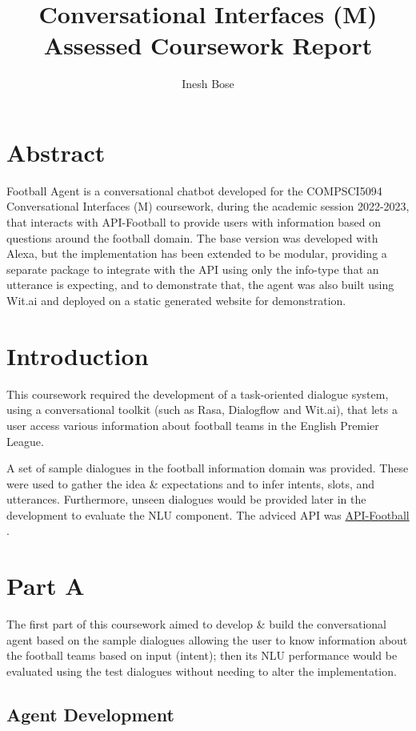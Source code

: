 \documentclass[10pt,a4paper,twocolumn]{article}
\title{Conversational Interfaces (M)\\Assessed Coursework Report}
\author{Inesh Bose}
\date{}
\newcommand{\cmmnt}[1]{}
\begin{document}
\maketitle

\section*{Abstract}

Football Agent is a conversational chatbot developed for the COMPSCI5094 Conversational Interfaces (M) coursework, during the academic session 2022-2023, that interacts with API-Football to provide users with information based on questions around the football domain. The base version was developed with Alexa, but the implementation has been extended to be modular, providing a separate package to integrate with the API using only the info-type that an utterance is expecting, and to demonstrate that, the agent was also built using Wit.ai and deployed on a static generated website for demonstration.

\section{Introduction}

This coursework required the development of a task-oriented dialogue system, using a conversational toolkit (such as Rasa, Dialogflow and Wit.ai), that lets a user access various information about football teams in the English Premier League.

A set of sample dialogues in the football information domain was provided. These were used to gather the idea \& expectations and to infer intents, slots, and utterances. Furthermore, unseen dialogues would be provided later in the development to evaluate the NLU component. The adviced API was \href{https://www.api-football.com/}{API-Football} \cite{APIFootb40:online}.

\section{Part A}

The first part of this coursework aimed to develop \& build the conversational agent based on the sample dialogues allowing the user to know information about the football teams based on input (intent); then its NLU performance would be evaluated using the test dialogues without needing to alter the implementation.

\subsection{Agent Development \cmmnt{\small (6 marks)}}
\end{document}
